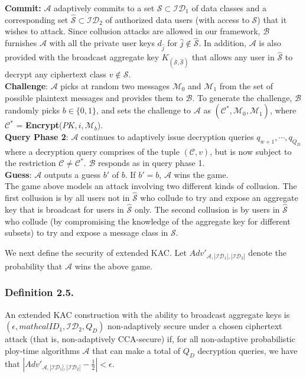 \noindent\textbf{Commit:} $\mathcal{A}$ adaptively commits to a set $\mathcal{S} \subset \mathcal{ID}_1$ of data classes and a corresponding set $\hat{\mathcal{S}} \subset \mathcal{ID}_2$ of authorized data users (with access to $\mathcal{S}$) that it wishes to attack. Since collusion attacks are allowed in our framework, $\mathcal{B}$ furnishes $\mathcal{A}$ with all the private user keys $d_{\hat{j}}$ for $\hat{j}\notin\hat{\mathcal{S}}$. In addition, $\mathcal{A}$ is also provided with the broadcast aggregate key $K_{\left(\overline{\mathcal{S}},\hat{\mathcal{S}}\right)}$ that allows any user in $\hat{\mathcal{S}}$ to decrypt any ciphertext class $v\notin{\mathcal{S}}$.\\  
 
\noindent\textbf{Challenge}: $\mathcal{A}$ picks at random two messages $\mathcal{M}_0$ and $\mathcal{M}_1$ from the set of possible plaintext messages and provides them to $\mathcal{B}$. To generate the challenge, $\mathcal{B}$ randomly picks $b\in\{0,1\}$, and sets the challenge to $\mathcal{A}$ as $(\mathcal{C}^{*},\mathcal{M}_0,\mathcal{M}_1)$, where ${\mathcal{C}}^{*}$ = \textbf{Encrypt}($PK,i,\mathcal{M}_b$).\\
 
\noindent\textbf{Query Phase 2}: $\mathcal{A}$ continues to adaptively issue decryption queries $q_{w+1},\cdots,q_{Q_D}$ where a decryption query comprises of the tuple $(\mathcal{C},v)$, but is now subject to the restriction $\mathcal{C}\neq {\mathcal{C}}^{*}$. $\mathcal{B}$ responds as in query phase 1.\\

\noindent\textbf{Guess}: $\mathcal{A}$ outputs a guess $b'$ of $b$. If $b' = b$, $\mathcal{A}$ wins the game.\\

The game above models an attack involving two different kinds of collusion. The first collusion is by all users not in $\hat{\mathcal{S}}$ who collude to try and expose an aggregate key that is broadcast for users in $\hat{\mathcal{S}}$ only. The second collusion is by users in $\hat{\mathcal{S}}$ who collude (by compromising the knowledge of the aggregate key for different subsets) to try and expose a message class in $\mathcal{S}$.

We next define the security of extended KAC. Let $Adv'_{\mathcal{A},|\mathcal{ID}_1|,|\mathcal{ID}_2|}$ denote the probability that $\mathcal{A}$ wins the above game.

\subsubsection{Definition 2.5.}
An extended KAC construction with the ability to broadcast aggregate keys is $(\epsilon,mathcal{ID}_1,\mathcal{ID}_2,Q_D)$ non-adaptively secure under a chosen ciphertext attack (that is, non-adaptively CCA-secure) if, for all non-adaptive probabilistic ploy-time algorithms $\mathcal{A}$ that can make a total of $Q_D$ decryption queries, we have that $|Adv'_{\mathcal{A},|\mathcal{ID}_1|,|\mathcal{ID}_2|}-\frac{1}{2}| < \epsilon$.


